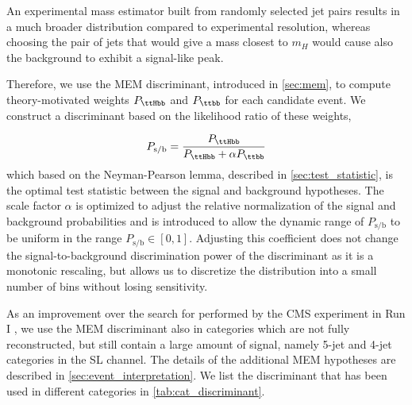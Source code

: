 An experimental mass estimator built from randomly selected jet pairs results in a much broader distribution compared to experimental resolution, whereas choosing the pair of jets that would give a mass closest to $m_H$ would cause also the background to exhibit a signal-like peak.

Therefore, we use the MEM discriminant, introduced in \cref{sec:mem}, to compute theory-motivated weights $P_{\ttHbb}$ and $P_{\ttbb}$ for each candidate event. We construct a discriminant based on the likelihood ratio of these weights,

\begin{equation}
\label{eq:mem_ratio}
P_{\mathrm{s}/\mathrm{b}} = \frac{P_{\ttHbb}}{P_{\ttHbb} + \alpha P_{\ttbb}}
\end{equation} 
which based on the Neyman-Pearson lemma, described in \cref{sec:test_statistic}, is the optimal test statistic between the signal and background hypotheses. The scale factor $\alpha$ is optimized to adjust the relative normalization of the signal and background probabilities and is introduced to allow the dynamic range of $P_{\mathrm{s}/\mathrm{b}}$ to be uniform in the range $P_{\mathrm{s}/\mathrm{b}} \in [0, 1]$. Adjusting this coefficient does not change the signal-to-background discrimination power of the discriminant as it is a monotonic rescaling, but allows us to discretize the distribution into a small number of bins without losing sensitivity.

As an improvement over the search for \ttHbb performed by the CMS experiment in Run I \cite{Khachatryan:2015ila}, we use the MEM discriminant also in categories which are not fully reconstructed, but still contain a large amount of signal, namely 5-jet and 4-jet categories in the SL channel. The details of the additional MEM hypotheses are described in \cref{sec:event_interpretation}. We list the discriminant that has been used in different categories in \cref{tab:cat_discriminant}. 


